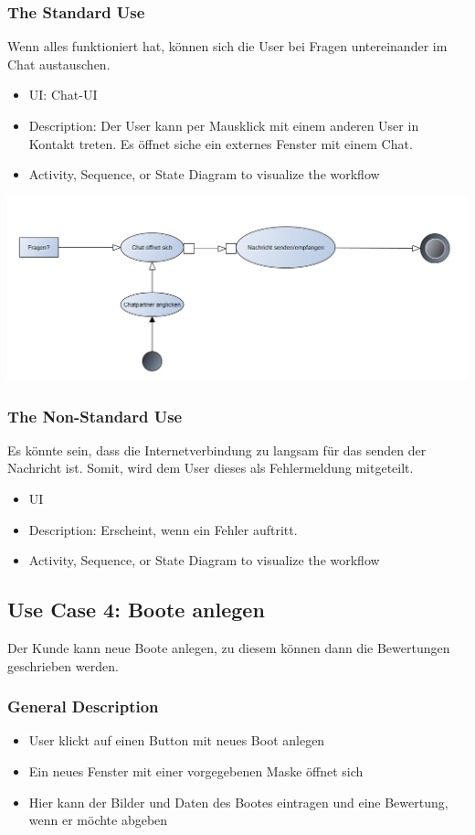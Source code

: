\documentclass[12pt]{article}
\theoremstyle{definition}
\begin{document}
\subsubsection{The Standard Use}
Wenn alles funktioniert hat, können sich die User bei Fragen untereinander im Chat austauschen.
\begin{itemize}
	\item UI: Chat-UI
	\item Description: Der User kann per Mausklick mit einem anderen User in Kontakt treten. Es öffnet siche ein externes Fenster mit einem Chat. 
	\item Activity, Sequence, or State Diagram to visualize the workflow
\end{itemize}
\includegraphics[height=0.40\textwidth]{Chatten.PNG}

\subsubsection{The Non-Standard Use}
Es könnte sein, dass die Internetverbindung zu langsam für das senden der Nachricht ist. Somit, wird dem User dieses als Fehlermeldung mitgeteilt.
\begin{itemize}
	\item UI
	\item Description: Erscheint, wenn ein Fehler auftritt.
	\item Activity, Sequence, or State Diagram to visualize the workflow
\end{itemize}
\pagebreak


\subsection{Use Case 4: Boote anlegen}
Der Kunde kann neue Boote anlegen, zu diesem können dann die Bewertungen geschrieben werden.
\subsubsection{General Description}
	\begin{itemize}
		\item User klickt auf einen Button mit neues Boot anlegen
		\item Ein neues Fenster mit einer vorgegebenen Maske öffnet sich
		\item Hier kann der Bilder und Daten des Bootes eintragen und eine Bewertung, wenn er möchte abgeben
	\end{itemize}
\end{document}
